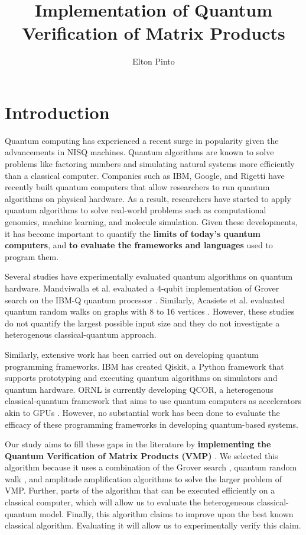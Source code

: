 \documentclass[10pt]{proc}
\title{
  Implementation of Quantum Verification of Matrix Products
}
\author{Elton Pinto}
\date{}
\theoremstyle{definition}
\theoremstyle{remark}
\begin{document}
\maketitle

\section{Introduction}

Quantum computing has experienced a recent surge in popularity given the
advancements in NISQ machines. Quantum algorithms are known to solve problems
like factoring numbers and simulating natural systems more efficiently than a
classical computer.  Companies such as IBM, Google, and Rigetti have recently
built quantum computers that allow researchers to run quantum algorithms on
physical hardware. As a result, researchers have started to apply quantum
algorithms to solve real-world problems such as computational genomics, machine
learning, and molecule simulation. Given these developments, it has become
important to quantify the \textbf{limits of today’s quantum computers}, and
\textbf{to evaluate the frameworks and languages} used to program them.

Several studies have experimentally evaluated quantum algorithms on quantum
hardware. Mandviwalla et al. evaluated a 4-qubit implementation of Grover
search on the IBM-Q quantum processor \cite{mandviwalla_implementing_2018}.
Similarly, Acasiete et al. evaluated quantum random walks on graphs with 8 to
16 vertices \cite{acasiete_implementation_2020}. However, these studies do not
quantify the largest possible input size and they do not investigate a
heterogenous classical-quantum approach.

Similarly, extensive work has been carried out on developing quantum
programming frameworks. IBM has created Qiskit, a Python framework that
supports prototyping and executing quantum algorithms on simulators and quantum
hardware. ORNL is currently developing QCOR, a heterogenous classical-quantum
framework that aims to use quantum computers as accelerators akin to GPUs
\cite{mintz_qcor_2020}.  However, no substantial work has been done to evaluate
the efficacy of these programming frameworks in developing quantum-based
systems.

Our study aims to fill these gaps in the literature by \textbf{implementing the
Quantum Verification of Matrix Products (VMP)}
\cite{buhrman_quantum_2005}\cite{ambainis_quantum_2002}. We selected this
algorithm because it uses a combination of the Grover search
\cite{nielsen_quantum_2000}, quantum random walk \cite{ambainis_quantum_2007},
and amplitude amplification \cite{lomonaco_quantum_2002} algorithms to solve
the larger problem of VMP. Further, parts of the algorithm that can be executed
efficiently on a classical computer, which will allow us to evaluate the
heterogeneous classical-quantum model. Finally, this algorithm claims to
improve upon the best known classical algorithm. Evaluating it will allow us to
experimentally verify this claim.
\end{document}
